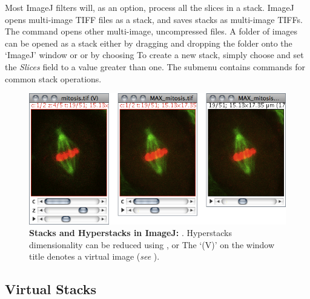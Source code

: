 Most ImageJ filters will, as an option, process all the slices in
a stack. ImageJ opens multi-image TIFF files as a stack, and saves
stacks as multi-image TIFFs. The 
command opens other multi-image, uncompressed files. A folder of images
can be opened as a stack either by dragging and dropping the folder
onto the `ImageJ' window or or by choosing 
To create a new stack, simply choose 
and set the \emph{Slices} field to a value greater than one. The 
submenu contains commands for common stack operations.
\begin{figure}
\noindent \includegraphics[scale=0.55]{images/StacksHyperstacks}\caption[Stacks and Hyperstacks]{\label{fig:Stacks-and-Hyperstacks}\textbf{Stacks and Hyperstacks
in ImageJ:}\textsf{ }\protect{}.
Hyperstacks dimensionality can be reduced using \protect{},
\protect{}
or \protect{}
The `(V)' on the window title denotes a virtual image (\emph{see}
).}
\end{figure}





\subsection*{Virtual Stacks\label{sub:Virtual-Stacks}}

